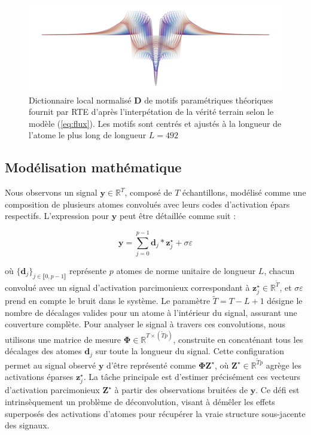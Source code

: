 \documentclass[9pt,a4paper,twoside]{rho}
\begin{document}
\begin{figure}[H]
    \centering
    \includegraphics[width=1\linewidth]{images/perfection.png}
    \caption{Dictionnaire local normalisé $\mathbf{D}$ de motifs paramétriques théoriques fournit par RTE d'après l'interpétation de la vérité terrain selon le modèle (\ref{eq:flux}). Les motifs sont centrés et ajustés à la longueur de l'atome le plus long de longueur $L = 492$}
    \label{fig:dictionary}
\end{figure}

\subsection{Modélisation mathématique}

Nous observons un signal $\mathbf{y} \in \mathbb{R}^T$, composé de $T$ échantillons, modélisé comme une composition de plusieurs atomes convolués avec leurs codes d'activation épars respectifs. L'expression pour $\mathbf{y}$ peut être détaillée comme suit :

\begin{equation}
    \mathbf{y} = \sum_{j=0}^{p-1} \mathbf{d}_j * \mathbf{z}_j^\star + \sigma \varepsilon
\end{equation}

où $\{\mathbf{d}_j\}_{j \in \llbracket 0, p-1 \rrbracket}$ représente $p$ atomes de norme unitaire de longueur $L$, chacun convolué avec un signal d'activation parcimonieux correspondant à $\mathbf{z}_j^\star \in \mathbb{R}^{\widetilde{T}}$, et $\sigma \varepsilon$ prend en compte le bruit dans le système. 
Le paramètre $\widetilde{T} = T-L+1$ désigne le nombre de décalages valides pour un atome à l'intérieur du signal, assurant une couverture complète. Pour analyser le signal à travers ces convolutions, nous utilisons une matrice de mesure $\boldsymbol{\Phi} \in \mathbb{R}^{T \times (\widetilde{T}p)}$, construite en concaténant tous les décalages des atomes $\mathbf{d}_j$ sur toute la longueur du signal. 
Cette configuration permet au signal observé $\mathbf{y}$ d'être représenté comme $\boldsymbol{\Phi} \mathbf{Z}^\star$, où $\mathbf{Z}^\star \in \mathbb{R}^{\widetilde{T} p}$ agrège les activations éparses $\mathbf{z}_j^\star$.
La tâche principale est d'estimer précisément ces vecteurs d'activation parcimonieux $\mathbf{Z}^\star$ à partir des observations bruitées de $\mathbf{y}$. Ce défi est intrinsèquement un problème de déconvolution, visant à démêler les effets superposés des activations d'atomes pour récupérer la vraie structure sous-jacente des signaux.
\end{document}
